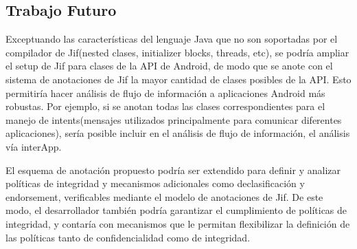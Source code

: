 \subsection{Trabajo Futuro}
Exceptuando las características del lenguaje Java que no son soportadas por el
compilador de Jif(nested clases, initializer blocks, threads, etc), se podría
ampliar el setup de Jif para clases de la API de Android, de modo que se
anote con el sistema de anotaciones de Jif la mayor cantidad de clases
posibles de la API.
Esto permitiría hacer análisis de flujo de información a aplicaciones
Android más robustas. Por ejemplo, si se anotan todas las clases
correspondientes para el manejo de intents(mensajes utilizados principalmente
para comunicar diferentes aplicaciones), sería posible incluir en el análisis de
flujo de información, el análisis vía interApp. 

El esquema de anotación propuesto podría ser
extendido para definir y analizar políticas de integridad y mecanismos
adicionales como declasificación y endorsement, verificables mediante el modelo
de anotaciones de Jif. De este modo, el desarrollador también podría garantizar
el cumplimiento de políticas de integridad, y contaría con mecanismos que le
permitan flexibilizar la definición de las políticas tanto de confidencialidad
como de integridad.
